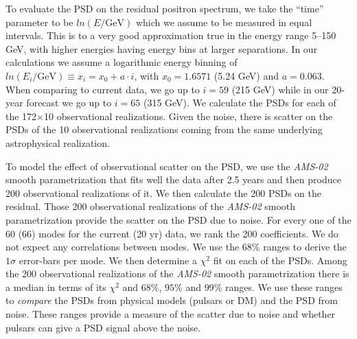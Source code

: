 \documentclass[aps,prd,twocolumn,amsmath,superscriptaddress,amssymb,showpacs,floatfix,nofootinbib]{revtex4-1}
\begin{document}
To evaluate the PSD on the residual positron spectrum,
we take the ``time'' parameter to be $ln(E/\textrm{GeV})$ which
we assume to be measured in equal intervals. This is to a very
good approximation true in the energy range 5--150 GeV, with
higher energies having energy bins at larger separations. In
our calculations we assume a logarithmic energy binning of
$ln(E_{i}/\textrm{GeV}) \equiv x_{i} = x_{0} + a \cdot i$, with
$x_{0} =1.6571$ (5.24 GeV) and $a=0.063$.  When comparing to
current data, we go up to $i=59$ (215 GeV) while in our
20-year forecast we go up to $i=65$ (315 GeV).  We calculate the
PSDs for each of the 172$\times$10 observational realizations.
Given the noise, there is scatter on the PSDs of the 10
observational realizations coming from the same underlying
astrophysical realization.

To model the effect of observational scatter on the PSD, we use the
\textit{AMS-02} smooth parametrization that fits well the data
after 2.5 years and then produce 200 observational realizations
of it.  We then calculate the 200 PSDs on the residual.  Those
200 observational realizations of the \textit{AMS-02} smooth
parametrization provide the scatter on the PSD due to noise. 
For every one of the 60 (66) modes for the current (20 yr) data,
we rank the 200 coefficients. We do not expect any
correlations between modes. We use the 68$\%$ ranges to derive
the $1 \sigma$ error-bars per mode.  We then determine a
$\chi^{2}$ fit on each of the PSDs. Among the 200 observational
realizations of the \textit{AMS-02} smooth parametrization there
is a median in terms of its $\chi^{2}$ and $68\%$, $95\%$ and
$99\%$ ranges. We use these ranges to \textit{compare} the PSDs
from physical models (pulsars or DM) and the PSD from
noise. These ranges provide a measure of the scatter due to
noise and whether pulsars can give a PSD signal above the noise.
 
\end{document}

